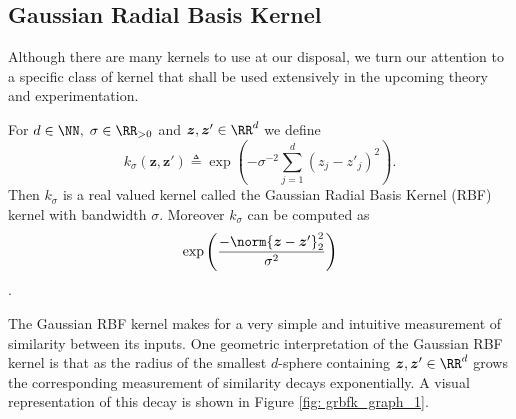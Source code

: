 \subsection{Gaussian Radial Basis Kernel}\label{Section1.3}

Although there are many kernels to use at our disposal, we turn our attention to a specific class of kernel that shall be used extensively in the upcoming theory and experimentation.

\begin{defe} \label{defe: grbfk}
    For $d \in \NN, \; \sigma \in \RR_{>0}$ and $ \bm{z} , \bm{z}' \in \RR^d$ we define
    \[
        k_\sigma \left( \bm{z} , \bm{z}' \right) \triangleq \exp \left( - \sigma^{-2} \sum_{j=1}^{d} \left( {z}_j - {{z}'}_j \right)^2 \right).
    \]
    Then $k_\sigma$ is a real valued kernel called the Gaussian Radial Basis Kernel (RBF) kernel with bandwidth $\sigma$. Moreover $k_\sigma$ can be computed as
    \[
        \exp \left( \frac{- \norm{\bm{z} - {\bm{z}'}}_{2}^{2}}{\sigma^2} \right)
    \]
    \cite{SteinwartIngo2008SVMb}.
\end{defe}
The Gaussian RBF kernel makes for a very simple and intuitive measurement of similarity between its inputs. One geometric interpretation of the Gaussian RBF kernel is that as the radius of the smallest $d$-sphere containing $\bm{z} , \bm{z}' \in \RR^d$ grows the corresponding measurement of similarity decays exponentially. A visual representation of this decay is shown in Figure \ref{fig: grbfk_graph_1}.







